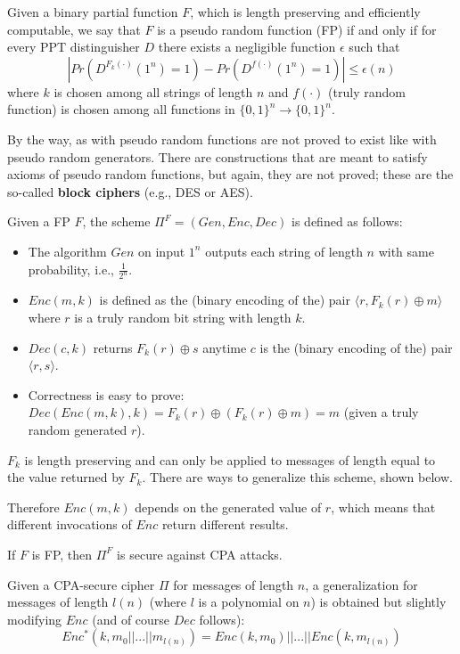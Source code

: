 \documentclass[../main]{subfiles}
\begin{document}
\begin{definition}
    Given a binary partial function $F$, which is length preserving and efficiently computable, 
    we say that $F$ is a pseudo random function (FP) if and only if for every PPT distinguisher $D$ 
    there exists a negligible function $\epsilon$ such that
    $$|Pr(D^{F_k(\cdot)}(1^n)=1)-Pr(D^{f(\cdot)}(1^n)=1)|\le{}\epsilon(n)$$
    where $k$ is chosen among all strings of length $n$ and $f(\cdot)$ (truly random function) is chosen among all functions in $\{0,1\}^n \rightarrow{} \{0,1\}^n$.
\end{definition}

\noindent
By the way, as with pseudo random functions are not proved to exist like with pseudo random generators.
There are constructions that are meant to satisfy axioms of pseudo random functions, but again, they are not proved; these are the so-called \textbf{block ciphers} (e.g., DES or AES).

\begin{definition}
    Given a FP $F$, the scheme $\Pi^F = (Gen,Enc,Dec)$ is defined as follows:
    \begin{itemize}
        \item The algorithm $Gen$ on input $1^n$ outputs each string of length $n$ with same probability, i.e., $\frac{1}{2^n}$.
        \item $Enc(m,k)$ is defined as the (binary encoding of the) pair $\langle r, F_k(r)\oplus m \rangle$ where $r$ is a truly random bit string with length $k$.
        \item $Dec(c,k)$ returns $F_k(r)\oplus s$ anytime $c$ is the (binary encoding of the) pair $\langle r, s \rangle$.
        \item Correctness is easy to prove: $Dec(Enc(m,k),k)=F_k(r)\oplus(F_k(r)\oplus m)=m$ (given a truly random generated $r$).
    \end{itemize}
    $F_k$ is length preserving and can only be applied to messages of length equal to the value returned by $F_k$.
    There are ways to generalize this scheme, shown below.
\end{definition}
Therefore $Enc(m,k)$ depends on the generated value of $r$, which means that different invocations of $Enc$ return different results.

\begin{theorem}
    If $F$ is FP, then $\Pi^F$ is secure against CPA attacks.
\end{theorem}

\begin{definition}
    Given a CPA-secure cipher $\Pi$ for messages of length $n$, a generalization for messages of length $l(n)$ (where $l$ is a polynomial on $n$) is obtained but slightly modifying $Enc$ (and of course $Dec$ follows):
    $$Enc^*(k, m_0 || ... || m_{l(n)}) = Enc(k,m_0) || ... || Enc(k,m_{l(n)})$$
\end{definition}
\end{document}
